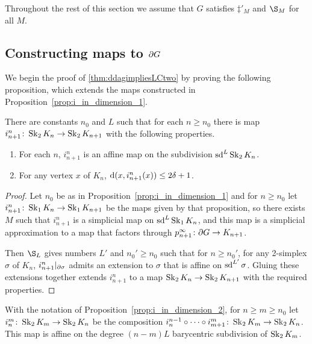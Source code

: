 \documentclass[a4paper]{article}
\begin{document}
Throughout the rest of this section we assume that $G$ satisfies
$\ddag'_M$ and $\S_M$ for all $M$.

\subsection{Constructing maps to $\partial G$}

We begin the proof of \cref{thm:ddagimpliesLCtwo} by proving the following 
proposition, which extends the maps constructed in
Proposition~\ref{prop:i_in_dimension_1}.

\begin{proposition}\label{prop:i_in_dimension_2}
  There are constants $n_0$ and $L$ such that for each $n\geq n_0$ there is map
  $i^n_{n+1}\colon\operatorname{Sk}_2 K_n \to \operatorname{Sk}_2 K_{n+1}$ with the following properties.
  \begin{enumerate}
    \item For each $n$, $i^n_{n+1}$ is an affine map on the subdivision
      $\operatorname{sd}^L\operatorname{Sk}_2 K_n$.
    \item For any vertex $x$ of $K_n$, $\operatorname{d}(x, i^n_{n+1}(x)) \leq 2\delta+1$.
  \end{enumerate}
\end{proposition}

\begin{proof} 
  Let $n_0$ be as in Proposition~\ref{prop:i_in_dimension_1} and for $n \geq
  n_0$ let $i^n_{n+1} \colon \operatorname{Sk}_1 K_n \to \operatorname{Sk}_1 K_{n+1}$ be the maps given
  by that proposition, so there exists $M$ such that $i^n_{n+1}$ is a
  simplicial map on $\operatorname{sd}^L\operatorname{Sk}_1 K_n$, and this map is a simplicial
  approximation to a map that factors through $p^\infty_{n+1} \colon \partial G
  \to K_{n+1}$.

  Then $\S_L$ gives numbers $L'$ and $n_0' \geq n_0$ such that for $n \geq
  n_0'$, for any 2-simplex $\sigma$ of $K_n$, $i^n_{n+1}\vert_{\partial
  \sigma}$ admits an extension to $\sigma$ that is affine on $\operatorname{sd}^{L'}\sigma$.
  Gluing these extensions together extends $i^n_{n+1}$ to a map $\operatorname{Sk}_2 K_n \to
  \operatorname{Sk}_2 K_{n+1}$ with the required properties.
\end{proof}

\begin{definition}
  With the notation of Proposition~\ref{prop:i_in_dimension_2}, for $n \geq m
  \geq n_0$ let $i^m_n \colon \operatorname{Sk}_2 K_m \to \operatorname{Sk}_2 K_n$ be the composition
  $i^{n-1}_n \circ \dotsb \circ i^m_{m+1} \colon \operatorname{Sk}_2 K_m \to 
  \operatorname{Sk}_2 K_n$.  This map is affine on the degree $(n-m)L$ barycentric
  subdivision of $\operatorname{Sk}_2 K_m$.
\end{definition}
\end{document}

